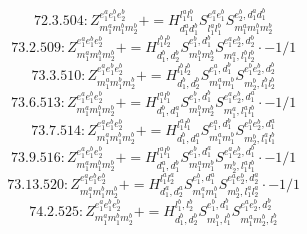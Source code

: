 \documentclass[letterpaper,10pt,fleqn,leqno,onecolumn]{article}
\begin{document}
\begin{equation} \;\;\;\;\;\;  72.3.504: Z^{e_{1}^{a}e_{1}^{b}e_{2}^{b}}_{m_{1}^{a}m_{1}^{b}m_{2}^{b}}+=H^{l_{1}^{a}l_{1}^{b}}_{d_{1}^{a}d_{1}^{b}}S^{e_{1}^{a}e_{1}^{b}}_{l_{1}^{a}l_{1}^{b}}S^{e_{2}^{b},d_{1}^{a}d_{1}^{b}}_{m_{1}^{a}m_{1}^{b}m_{2}^{b}} \end{equation}
\begin{equation} \;\;\;\;\;\;  73.2.509: Z^{e_{1}^{a}e_{1}^{b}e_{2}^{b}}_{m_{1}^{a}m_{1}^{b}m_{2}^{b}}+=H^{l_{1}^{b}l_{2}^{b}}_{d_{1}^{b},d_{2}^{b}}S^{e_{1}^{b},d_{1}^{b}}_{m_{1}^{b}m_{2}^{b}}S^{e_{1}^{a}e_{2}^{b},d_{2}^{b}}_{m_{1}^{a},l_{1}^{b}l_{2}^{b}}\cdot -1/1 \end{equation}
\begin{equation} \;\;\;\;\;\;  73.3.510: Z^{e_{1}^{a}e_{1}^{b}e_{2}^{b}}_{m_{1}^{a}m_{1}^{b}m_{2}^{b}}+=H^{l_{1}^{b}l_{2}^{b}}_{d_{1}^{b},d_{2}^{b}}S^{e_{1}^{a},d_{1}^{b}}_{m_{1}^{a}m_{1}^{b}}S^{e_{1}^{b}e_{2}^{b},d_{2}^{b}}_{m_{2}^{b},l_{1}^{b}l_{2}^{b}} \end{equation}
\begin{equation} \;\;\;\;\;\;  73.6.513: Z^{e_{1}^{a}e_{1}^{b}e_{2}^{b}}_{m_{1}^{a}m_{1}^{b}m_{2}^{b}}+=H^{l_{1}^{a}l_{1}^{b}}_{d_{1}^{b},d_{1}^{a}}S^{e_{1}^{b},d_{1}^{b}}_{m_{1}^{b}m_{2}^{b}}S^{e_{1}^{a}e_{2}^{b},d_{1}^{a}}_{m_{1}^{a},l_{1}^{a}l_{1}^{b}}\cdot -1/1 \end{equation}
\begin{equation} \;\;\;\;\;\;  73.7.514: Z^{e_{1}^{a}e_{1}^{b}e_{2}^{b}}_{m_{1}^{a}m_{1}^{b}m_{2}^{b}}+=H^{l_{1}^{a}l_{1}^{b}}_{d_{1}^{b},d_{1}^{a}}S^{e_{1}^{a},d_{1}^{b}}_{m_{1}^{a}m_{1}^{b}}S^{e_{1}^{b}e_{2}^{b},d_{1}^{a}}_{m_{2}^{b},l_{1}^{a}l_{1}^{b}} \end{equation}
\begin{equation} \;\;\;\;\;\;  73.9.516: Z^{e_{1}^{a}e_{1}^{b}e_{2}^{b}}_{m_{1}^{a}m_{1}^{b}m_{2}^{b}}+=H^{l_{1}^{a}l_{1}^{b}}_{d_{1}^{a},d_{1}^{b}}S^{e_{1}^{b},d_{1}^{a}}_{m_{1}^{a}m_{1}^{b}}S^{e_{1}^{a}e_{2}^{b},d_{1}^{b}}_{m_{2}^{b},l_{1}^{a}l_{1}^{b}}\cdot -1/1 \end{equation}
\begin{equation} \;\;\;\;\;\;  73.13.520: Z^{e_{1}^{a}e_{1}^{b}e_{2}^{b}}_{m_{1}^{a}m_{1}^{b}m_{2}^{b}}+=H^{l_{1}^{a}l_{2}^{a}}_{d_{1}^{a},d_{2}^{a}}S^{e_{1}^{b},d_{1}^{a}}_{m_{1}^{a}m_{1}^{b}}S^{e_{1}^{a}e_{2}^{b},d_{2}^{a}}_{m_{2}^{b},l_{1}^{a}l_{2}^{a}}\cdot -1/1 \end{equation}
\begin{equation} \;\;\;\;\;\;  74.2.525: Z^{e_{1}^{a}e_{1}^{b}e_{2}^{b}}_{m_{1}^{a}m_{1}^{b}m_{2}^{b}}+=H^{l_{1}^{b},l_{2}^{b}}_{d_{1}^{b},d_{2}^{b}}S^{e_{1}^{b},d_{1}^{b}}_{m_{1}^{b},l_{1}^{b}}S^{e_{1}^{a}e_{2}^{b},d_{2}^{b}}_{m_{1}^{a}m_{2}^{b},l_{2}^{b}} \end{equation}
\end{document}
